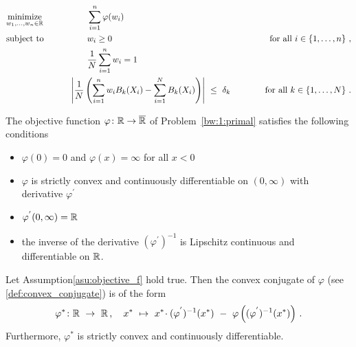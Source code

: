 \begin{fproblem}
  \label{bw:1:primal}
\begin{align*}
    &\underset{w_1, \ldots, w_n \in \R}
    {\text{minimize}}
    &&\qquad\qquad
    \sum_{i = 1}^{n} 
    \varphi(w_i)
    &&&
    \\
    &\text{subject to}
    &&\qquad\qquad
    w_i 
    \ge
    0
    &&&
    \qquad
    \text{for all}\ 
    i \in \left\{ 1, \ldots, n \right\}
    \,,
    \\
    & 
    &&\qquad\qquad
    \frac{1}{N}
    \sum_{i=1}^{n} 
    w_i
    =1
    \\
    & 
    &&\qquad
    \left| 
      \frac{1}{N} 
      \left( 
      \sum_{i = 1}^{n} 
      w_i
      B_k(X_i)
      -
      \sum_{i=1}^{N} 
      B_k(X_i)
      \right)
    \right|
    \ 
    \le 
    \ 
    \delta_k
    &&&
    \qquad
    \text{for all}\ 
    k \in \left\{ 1, \ldots, N \right\}
    \,.
\end{align*}
\end{fproblem}
\newpage
\begin{assumption}
  \label{asu:objective_f}
  The objective function $\varphi\colon \mathbb{R}\to\overline{\mathbb{R}}$ of Problem~\ref{bw:1:primal} 
  satisfies the following conditions
  \begin{itemize}
    \item
      $\varphi(0)=0$ and $\varphi(x)=\infty$ for all $x<0$
    \item
      $\varphi$ is strictly convex and continuously differentiable on $(0,\infty)$ with derivative $\varphi^{'}$
    \item
      $\varphi^{'}(0,\infty)=\mathbb{R}$
    \item
      the inverse of the derivative $(\varphi^{'})^{-1}$ is Lipschitz continuous and differentiable on $\mathbb{R}$.
  \end{itemize}
\end{assumption}
\begin{lemma}
  Let Assumption\ref{asu:objective_f} hold true. Then the convex conjugate of $\varphi$ (see \eqref{def:convex_conjugate}) is of the form
  \begin{gather*}
    \varphi^*
    \colon
    \R
    \ 
    \to
    \ 
    \R
    \,,
    \quad
    x^*
    \ 
    \mapsto
    \ 
    x^*
    \!
    \cdot
    (
    \varphi^{'}
    )^{-1}
    (x^*)
    \ 
    -
    \ 
    \varphi
    \left( 
      (
    \varphi^{'}
    )^{-1}
    (x^*)
    \right)
    \,.
  \end{gather*}
  Furthermore, $\varphi^*$ is strictly convex and continuously differentiable.
\end{lemma}

